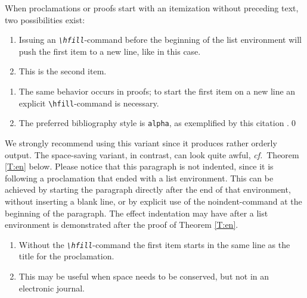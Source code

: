 \documentclass{jpc} %
\theoremstyle{plain}\newtheorem{satz}[thm]{Satz} %
\def\cf{{\em cf.}}
\begin{document}
  When proclamations or proofs start with an itemization without
  preceding text, two possibilities exist:

\begin{thm}\label{T:m}\hfill  %
\begin{enumerate}
\item
  Issuing an {\em\texttt{\textbackslash hfill}}-command before the
  beginning of the list environment will push the first item to a new
  line, like in this case.
\item
  This is the second item.
\end{enumerate}
\end{thm}

\proof\hfill  %
\begin{enumerate}
\item
  The same behavior occurs in proofs; to start the first item on a
  new line an explicit \texttt{\textbackslash hfill}-command is necessary.
\item
  The preferred bibliography style is \texttt{alpha}, as exemplified
  by this citation \cite{koslowski:mib}.\qed
\end{enumerate}

  \noindent We strongly recommend using this variant since it produces
  rather orderly output.  The space-saving variant, in contrast, can
  look quite awful, \cf~Theorem \ref{T:en} below.  Please notice that
  this paragraph is not indented, since it is following a proclamation
  that ended with a list environment.  This can be achieved by
  starting the paragraph directly after the end of that environment,
  without inserting a blank line, or by explicit use of the
  noindent-command at the beginning of the paragraph.  The effect
  indentation may have after a list environment is demonstrated after
  the proof of Theorem \ref{T:en}. 
 
\begin{thm}\label{T:en} %

\begin{enumerate}%
\item  
  Without the \emph{\texttt{\textbackslash hfill}}-command the first item
  starts in the same line as the title for the proclamation.
\item
  This may be useful when space needs to be conserved, but not in an
  electronic journal.
\end{enumerate}
\end{thm}
\end{document}
